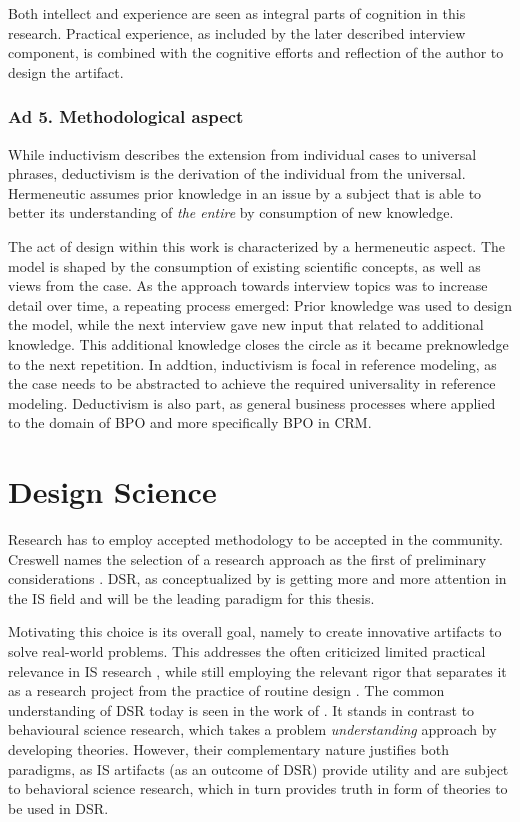 Both intellect and experience are seen as integral parts of cognition in this research. Practical experience, as included by the later described interview component, is combined with the cognitive efforts and reflection of the author to design the artifact. 

\subsubsection{Ad 5. Methodological aspect}
While inductivism describes the extension from individual cases to universal phrases, deductivism is the derivation of the individual from the universal. Hermeneutic assumes prior knowledge in an issue by a subject that is able to better its understanding of \textit{the entire} by consumption of new knowledge. 

The act of design within this work is characterized by a hermeneutic aspect. The model is shaped by the consumption of existing scientific concepts, as well as views from the case. As the approach towards interview topics was to increase detail over time, a repeating process emerged: Prior knowledge was used to design the model, while the next interview gave new input that related to additional knowledge. This additional knowledge closes the circle as it became preknowledge to the next repetition. In addtion, inductivism is focal in reference modeling, as the case needs to be abstracted to achieve the required universality in reference modeling. Deductivism is also part, as general business processes where applied to the domain of BPO and more specifically BPO in CRM. 


\section{Design Science}
Research has to employ accepted methodology to be accepted in the community. Creswell names the selection of a research approach as the first of preliminary considerations \cite{creswell2013research}. \acrfull{DSR}, as conceptualized by \cite{simon1996sciences} is getting more and more attention in the \acrshort{IS} field and will be the leading paradigm for this thesis. 

Motivating this choice is its overall goal, namely to create innovative artifacts to solve real-world problems. This addresses the often criticized limited practical relevance in \acrshort{IS} research \cite{hirschheim}, while still employing the relevant rigor that separates it as a research project from the practice of routine design \cite{Winter2008Hevner}. The common understanding of \acrshort{DSR} today is seen in the work of \cite{Hevner2004}. It stands in contrast to behavioural science research, which takes a problem \textit{understanding} approach by developing theories. However, their complementary nature justifies both paradigms, as IS artifacts (as an outcome of \acrshort{DSR}) provide utility and are subject to behavioral science research, which in turn provides truth in form of theories to be used in \acrshort{DSR}.

